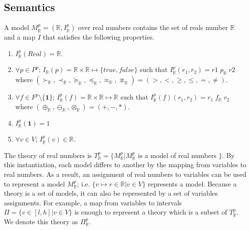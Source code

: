 \subsection{Semantics}
A model $M^p_{\mathbb{R}} = (\mathbb{R}, I^p_{\mathbb{R}})$ over real numbers contains the set of reals number $\mathbb{R}$ and a map $I$ that satisfies the following properties.
\begin{enumerate}
\item $I^p_{\mathbb{R}}(Real) = \mathbb{R}$.
\item $\forall p \in P^p$; $I_{\mathbb{R}}(p) = \mathbb{R} \times \mathbb{R} \mapsto \{true, false\}$ such that $ I_\mathbb{R}^p(r_1, r_2) = r1 \; p_{\mathbb{R}} \; r2$ where $(\succ_\mathbb{R}, \prec_{\mathbb{R}},\succeq_\mathbb{R},\preceq_{\mathbb{R}}, \approx_\mathbb{R}, \not\approx_\mathbb{R}) = (>, <, \ge, \le, =, \neq)$.
\item $\forall f \in F^p \setminus \{\mathbf{1}\}$; $I^p_{\mathbb{R}}(f) = \mathbb{R} \times \mathbb{R} \mapsto \mathbb{R}$ such that $I^p_{\mathbb{R}}(f)(r_1, r_2)  = r_1 \; f_{\mathbb{R}} \; r_2$ where $(\oplus_{\mathbb{R}}, \ominus_{\mathbb{R}}, \otimes_{\mathbb{R}}) = (+, -, *)$.
\item $I^p_\mathbb{R}(\mathbf{1}) = 1$
\item $\forall v \in V$; $I^p_{\mathbb{R}}(v) \in \mathbb{R}$.
\end{enumerate}
The theory of real numbers is $T^p_{\mathbb{R}} = \{M^p_{\mathbb{R}} | M^p_{\mathbb{R}}$ is a model of real numbers $\}$.
By this instantiation, each model differs to another by the mapping from variables to real numbers. As a result, an assignment of real numbers to variables can be used to represent a model $M^p_{\mathbb{R}}$; i.e. $\{v \mapsto r \in \mathbb{R} | v \in V\}$ represents a model. Because a theory is a set of models, it can also be represented by a set of variables assignments. For example, a map from variables to intervals $\Pi = \{v \in [l, h] | v \in V\}$ is enough to represent a theory which is a subset of $T^p_\mathbb{R}$. We denote this theory as $\Pi^p_\mathbb{R}$.

